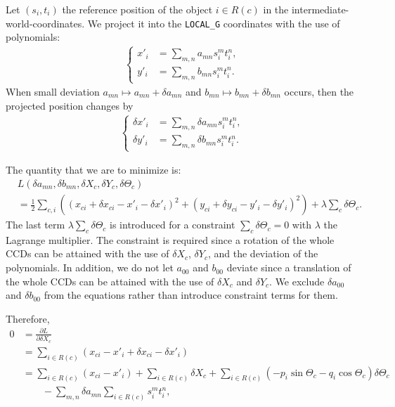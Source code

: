 \documentclass{scrartcl}
\begin{document}
Let $(s_i, t_i)$ the reference position of the object $i \in R(c)$
in the intermediate-world-coordinates. We project it into the \texttt{LOCAL\_G} coordinates
with the use of polynomials:
\begin{align}
    \left\{\begin{aligned}
        x'_i &= \sum_{m,n} a_{mn} s_i^m t_i^n
    ,\\ y'_i &= \sum_{m,n} b_{mn} s_i^m t_i^n
    .
    \end{aligned}\right.
\end{align}
When small deviation $a_{mn} \mapsto a_{mn} + \delta a_{mn}$
and $b_{mn} \mapsto b_{mn} + \delta b_{mn}$ occurs, then the projected
position changes by
\begin{align}
    \left\{\begin{aligned}
        \delta x'_i &= \sum_{m,n} \delta a_{mn} s_i^m t_i^n
    ,\\ \delta y'_i &= \sum_{m,n} \delta b_{mn} s_i^m t_i^n
    .
    \end{aligned}\right.
\end{align}

The quantity that we are to minimize is:
\begin{align}
&   L(\delta a_{mn}, \delta b_{mn}, \delta X_c, \delta Y_c, \delta\Theta_c)
\\  &= \frac{1}{2} \sum_{c,i} \left(
        \left( x_{ci} + \delta x_{ci} - x'_i - \delta x'_i \right)^2
        + \left( y_{ci} + \delta y_{ci} - y'_i - \delta y'_i \right)^2
        \right) + \lambda \sum_c \delta \Theta_c
    .
\end{align}
The last term $\lambda \sum_c \delta \Theta_c$ is introduced for a constraint
$\sum_c \delta \Theta_c = 0$ with $\lambda$ the Lagrange multiplier.
The constraint is required since a rotation of the whole CCDs can be attained
with the use of $\delta X_c$, $\delta Y_c$, and the deviation of the polynomials.
In addition, we do not let $a_{00}$ and $b_{00}$ deviate since a translation of
the whole CCDs can be attained with the use of $\delta X_c$ and $\delta Y_c$.
We exclude $\delta a_{00}$ and $\delta b_{00}$ from the equations rather than
introduce constraint terms for them.

Therefore,
\begin{align}
    0
    &= \frac{\partial L}{\partial \delta X_{c}}
\\  &= \sum_{i \in R(c)} \left( x_{ci} - x'_i + \delta x_{ci} - \delta x'_i\right)
\\  &= \sum_{i \in R(c)} \left( x_{ci} - x'_i \right)
        + \sum_{i \in R(c)} \delta X_{c}
        + \sum_{i \in R(c)} \left(- p_i \sin \Theta_c - q_i \cos \Theta_c \right) \delta \Theta_c
            \nonumber \\ & \qquad
        - \sum_{m,n} \delta a_{mn} \sum_{i \in R(c)} s_i^{m} t_i^{n}
,
\end{align}
\end{document}
